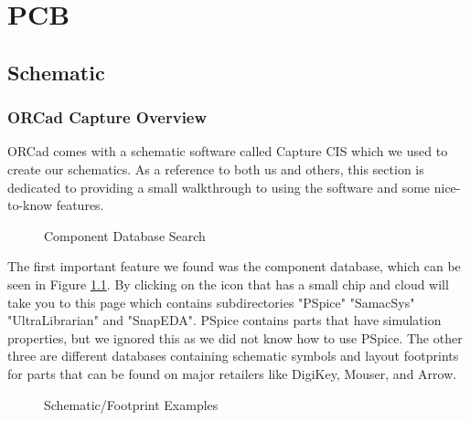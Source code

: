 \chapter{PCB
\label{PCB}}
\section{Schematic}
\subsection{ORCad Capture Overview}
ORCad comes with a schematic software called Capture CIS which we used to create our schematics. As a reference to both us and others, this section is
dedicated to providing a small walkthrough to using the software and some nice-to-know features.
\begin{figure}[H]
  \centering
\caption{Component Database Search}
\label{img:ultralib}
\end{figure}

The first important feature we found was the component database, which can be seen in Figure \ref{img:ultralib}. By clicking on the icon that has a small chip and cloud will 
take you to this page which contains subdirectories "PSpice" "SamacSys" "UltraLibrarian" and "SnapEDA". PSpice contains parts that
have simulation properties, but we ignored this as we did not know how to use PSpice. The other three are different databases
containing schematic symbols and layout footprints for parts that can be found on major retailers like DigiKey, Mouser, and Arrow.

\begin{figure}[H]
  \centering
\caption{Schematic/Footprint Examples}
\label{img:ultralibexample}
\end{figure}

